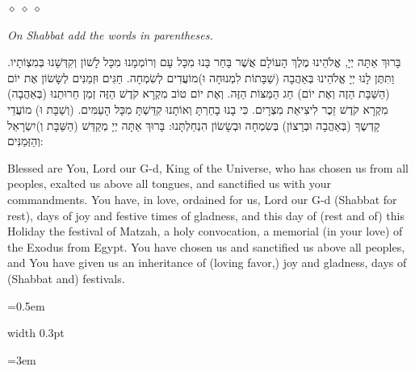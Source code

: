 \documentclass[11pt, openany]{book}
\newcommand{\instruction}[1]{%
  \par\vspace{3pt}
  \begin{tcolorbox}[
    enhanced,
    breakable,
    colback=sederlight,
    colframe=sederlight,
    boxrule=0pt,
    left=10pt,
    right=6pt,
    top=4pt,
    bottom=4pt,
    borderline west={2pt}{0pt}{sederwine!60},
    arc=0pt,
    outer arc=0pt,
  ]
    {\small\itshape\textcolor{sederwine}{#1}}
  \end{tcolorbox}
  \par\vspace{2pt}
}
\newcommand{\sederdivider}{%
  \par\vspace{6pt}
  \begin{center}
    \textcolor{sedergold}{\pgfornament[width=1.5cm]{11}}
  \end{center}
  \par\vspace{6pt}
}
\newlength{\bidiHebWidth}
\newlength{\bidiEngWidth}
\newenvironment{bilingual}{%
  \par\vspace{4pt}%
}{%
  \noindent
  \begin{minipage}[t]{\bidiEngWidth}
    \setstretch{1.4}\emergencystretch=0.5em\normalsize
    \usebox{\bidiEngBox}
  \end{minipage}%
  \hfill
  {\color{sedergold}\vrule width 0.3pt}%
  \hfill
  \begin{minipage}[t]{\bidiHebWidth}
    \begingroup\hebrewfont\TeXXeTstate=1\beginR
    \large\setstretch{1.4}\emergencystretch=3em\tolerance=9999\parindent=0pt\relax
    \usebox{\bidiHebBox}
    \endR\endgroup
  \end{minipage}%
  \par\vspace{2pt}%
}
\newenvironment{hebrewcol}{%
  \begin{lrbox}{\bidiHebBox}\begin{minipage}{\bidiHebWidth}%
}{%
  \end{minipage}\end{lrbox}%
}
\newenvironment{englishcol}{%
  \begin{lrbox}{\bidiEngBox}\begin{minipage}{\bidiEngWidth}%
}{%
  \end{minipage}\end{lrbox}%
}
\newcommand{\parasep}{%
  \par\vspace{3pt}
  \begin{center}
    \textcolor{sedergold!50}{\tiny$\diamond\;\diamond\;\diamond$}
  \end{center}
  \par\vspace{3pt}
}
\begin{document}
\parasep

\instruction{On Shabbat add the words in parentheses.}

\begin{bilingual}
\begin{hebrewcol}
בָּרוּךְ אַתָּה יְיָ, אֱלֹהֵינוּ מֶלֶךְ הָעוֹלָם אֲשֶׁר בָּחַר בָּנוּ מִכָּל עָם וְרוֹמְמָנוּ מִכָּל לָשׁוֹן וְקִדְּשָׁנוּ בְּמִצְוֹתָיו. וַתִּתֶּן לָנוּ יְיָ אֱלֹהֵינוּ בְּאַהֲבָה (שַׁבָּתוֹת לִמְנוּחָה וּ)מוֹעֲדִים לְשִׂמְחָה. חַגִּים וּזְמַנִּים לְשָׂשׂוֹן אֶת יוֹם (הַשַּׁבָּת הַזֶה וְאֶת יוֹם) חַג הַמַּצּוֹת הַזֶּה. וְאֶת יוֹם טוֹב מִקְרָא קֹדֶשׁ הַזֶּה זְמַן חֵרוּתֵנוּ (בְּאַהֲבָה) מִקְרָא קֹדֶשׁ זֵכֶר לִיצִיאַת מִצְרָיִם. כִּי בָנוּ בָחַרְתָּ וְאוֹתָנוּ קִדַּשְׁתָּ מִכָּל הָעַמִּים. (וְשַׁבָּת וּ) מוֹעֲדֵי קָדְשֶךָ (בְּאַהֲבָה וּבְרָצוֹן) בְּשִׂמְחָה וּבְשָׂשׂוֹן הִנְחַלְתָּנוּ: בָּרוּךְ אַתָּה יְיָ מְקַדֵּשׁ (הַשַּׁבָּת וְ)יִשְׂרָאֵל וְהַזְּמַנִּים:
\end{hebrewcol}
\begin{englishcol}
Blessed are You, Lord our G-d, King of the Universe, who has chosen us from all peoples, exalted us above all tongues, and sanctified us with your commandments. You have, in love, ordained for us, Lord our G-d (Shabbat for rest), days of joy and festive times of gladness, and this day of (rest and of) this Holiday the festival of Matzah, a holy convocation, a memorial (in your love) of the Exodus from Egypt. You have chosen us and sanctified us above all peoples, and You have given us an inheritance of (loving favor,) joy and gladness, days of (Shabbat and) festivals.
\end{englishcol}
\end{bilingual}

\sederdivider
\end{document}
